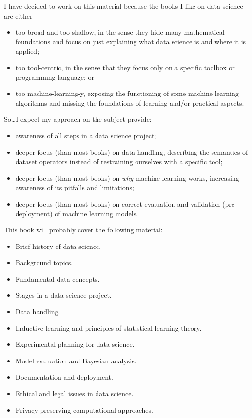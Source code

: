 I have decided to work on this material because the books I like on data science are
either
\begin{itemize}
  \item too broad and too shallow, in the sense they hide many mathematical foundations
    and focus on just explaining what data science is and where it is applied;
  \item too tool-centric, in the sense that they focus only on a specific toolbox or
    programming language; or
  \item too machine-learning-y, exposing the functioning of some machine learning
    algorithms and missing the foundations of learning and/or practical aspects.
\end{itemize}

So\dots I expect my approach on the subject provide:
\begin{itemize}
  \item awareness of all steps in a data science project;
  \item deeper focus (than most books) on data handling, describing the semantics of dataset
    operators instead of restraining ourselves with a specific tool;
  \item deeper focus (than most books) on \emph{why} machine learning works, increasing awareness of its pitfalls and
    limitations;
  \item deeper focus (than most books) on correct evaluation and validation
    (pre-deployment) of machine learning models.
\end{itemize}

This book will probably cover the following material:
\begin{itemize}
  \item Brief history of data science.
  \item Background topics.
  \item Fundamental data concepts.
  \item Stages in a data science project.
  \item Data handling.
  \item Inductive learning and principles of statistical learning theory.
  \item Experimental planning for data science.
  \item Model evaluation and Bayesian analysis.
  \item Documentation and deployment.
  \item Ethical and legal issues in data science.
  \item Privacy-preserving computational approaches.
\end{itemize}
